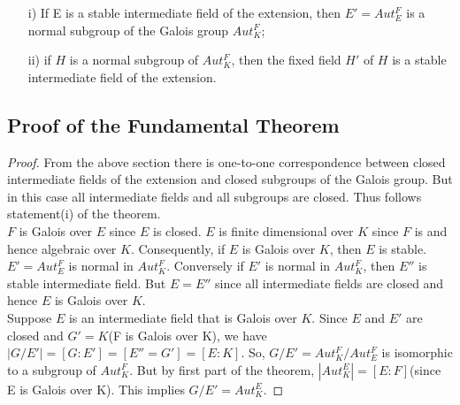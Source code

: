 \begin{lemma}
   \begin{enumerate}
  \item[i)] If E is a stable intermediate field of the extension, then \(E'=Aut_E^F\) is a normal subgroup of the Galois group \(Aut_K^F\);
  \item[ii)] if \(H\) is a normal subgroup of \(Aut_K^F\), then the fixed field \(H'\) of \(H\) is a stable intermediate field of the extension.
  \end{enumerate}
\end{lemma}

\subsection{Proof of the Fundamental Theorem}
\begin{proof}
  From the above section there is one-to-one correspondence between closed intermediate fields of the extension and closed subgroups of the Galois group. But in this case all intermediate fields and all subgroups are closed. Thus follows statement(i) of the theorem.\\

  \(F\) is Galois over \(E\) since \(E\) is closed. \(E\) is finite dimensional over \(K\) since \(F\) is and hence algebraic over \(K\). Consequently, if \(E\) is Galois over \(K\), then \(E\) is stable.
  \(E'=Aut_E^F\) is normal in \(Aut_K^F\). Conversely if \(E'\) is normal in \(Aut_K^F\), then \(E''\) is stable intermediate field. But \(E=E''\) since all intermediate fields are closed and hence \(E\) is Galois over \(K\).\\

  Suppose \(E\) is an intermediate field that is Galois over \(K\). Since \(E\) and \(E'\) are closed and \(G'=K\)(F is Galois over K), we have \(|G/E'|=[G:E']=[E''=G']=[E:K]\). So, \(G/E'=Aut_K^F/Aut_E^F\) is isomorphic to a subgroup of \(Aut_K^F\). But by first part of the theorem, \(|Aut_K^E|=[E:F]\)(since E is Galois over K). This implies \(G/E'=Aut_K^E\).
\end{proof}
